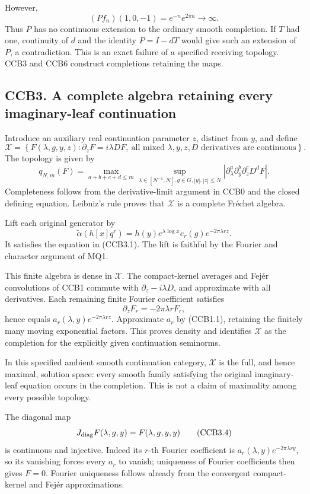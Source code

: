 However, \[
(Pf_n)(1,0,-1)=e^{-n}e^{2\pi n}\longrightarrow\infty.
\] Thus \(P\) has no continuous extension to the ordinary smooth
completion. If \(T\) had one, continuity of \(d\) and the identity
\(P=I-dT\) would give such an extension of \(P\), a contradiction. This
is an exact failure of a specified receiving topology. CCB3 and CCB6
construct completions retaining the maps.

\subsection{CCB3. A complete algebra retaining every imaginary-leaf
continuation}\label{ccb3.-a-complete-algebra-retaining-every-imaginary-leaf-continuation}

Introduce an auxiliary real continuation parameter \(z\), distinct from
\(y\), and define \[
\mathcal X=
\left\{F(\lambda,g,y,z):
\partial_zF=i\lambda DF,\
\text{all mixed }\lambda,y,z,D\text{ derivatives are continuous}\right\}.
\tag{CCB3.1}
\] The topology is given by \[
q_{N,m}(F)=
\max_{a+b+c+d\le m}
\sup_{\lambda\in[N^{-1},N],g\in G,|y|,|z|\le N}
|\partial_\lambda^a\partial_y^b\partial_z^cD^dF|.
\tag{CCB3.2}
\] Completeness follows from the derivative-limit argument in CCB0 and
the closed defining equation. Leibniz's rule proves that \(\mathcal X\)
is a complete Fréchet algebra.

Lift each original generator by \[
\widetilde\alpha(h[x]q^r)
=h(y)e^{\lambda\log x}e_r(g)e^{-2\pi\lambda rz}.
\tag{CCB3.3}
\] It satisfies the equation in (CCB3.1). The lift is faithful by the
Fourier and character argument of MQ1.

This finite algebra is dense in \(\mathcal X\). The compact-kernel
averages and Fejér convolutions of CCB1 commute with
\(\partial_z-i\lambda D\), and approximate with all derivatives. Each
remaining finite Fourier coefficient satisfies \[
\partial_zF_r=-2\pi\lambda r F_r,
\] hence equals \(a_r(\lambda,y)e^{-2\pi\lambda rz}\). Approximate
\(a_r\) by (CCB1.1), retaining the finitely many moving exponential
factors. This proves density and identifies \(\mathcal X\) as the
completion for the explicitly given continuation seminorms.

In this specified ambient smooth continuation category, \(\mathcal X\)
is the full, and hence maximal, solution space: every smooth family
satisfying the original imaginary-leaf equation occurs in the
completion. This is not a claim of maximality among every possible
topology.

The diagonal map \[
J_{\rm diag}F(\lambda,g,y)=F(\lambda,g,y,y)
\tag{CCB3.4}
\] is continuous and injective. Indeed its \(r\)-th Fourier coefficient
is \(a_r(\lambda,y)e^{-2\pi\lambda ry}\), so its vanishing forces every
\(a_r\) to vanish; uniqueness of Fourier coefficients then gives
\(F=0\). Fourier uniqueness follows already from the convergent
compact-kernel and Fejér approximations.


